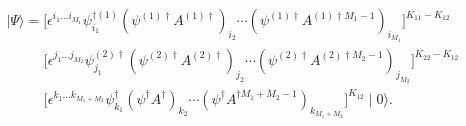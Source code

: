 \begin{equation}
\begin{array}{l}
\label{nvacuum}
\mid \Psi \rangle = 
\bigl[ \epsilon ^{i_1...i_{M_1}} \psi^{\dag(1)}_{i_1} 
(\psi^{(1)\dag}A^{(1)\dag})_{i_2}\cdots
(\psi^{(1)\dag} A^{(1)\dag M_1-1})_{i_{M_1}} \bigr]^{K_{11}-K_{12}}\\
\qquad \ \ \ 
\bigl[ \epsilon ^{j_1...j_{M_2}} \psi^{(2)\dag}_{j_1} 
(\psi^{(2)\dag}A^{(2)\dag})_{j_2}\cdots
(\psi^{(2)\dag} A^{(2)\dag M_2-1})_{j_{M_2}} \bigr]^{K_{22}-K_{12}}\\
\qquad \ \ \ 
\bigl[ \epsilon ^{k_1...k_{M_1+M_2}} \psi^{\dag}_{k_1} 
(\psi^{\dag}A^{\dag})_{k_2}\cdots
(\psi^{\dag} A^{\dag M_1+M_2-1})_{k_{M_1+M_2}} \bigr]^{K_{12}} \mid 0 \rangle.
\end{array}
\end{equation}

